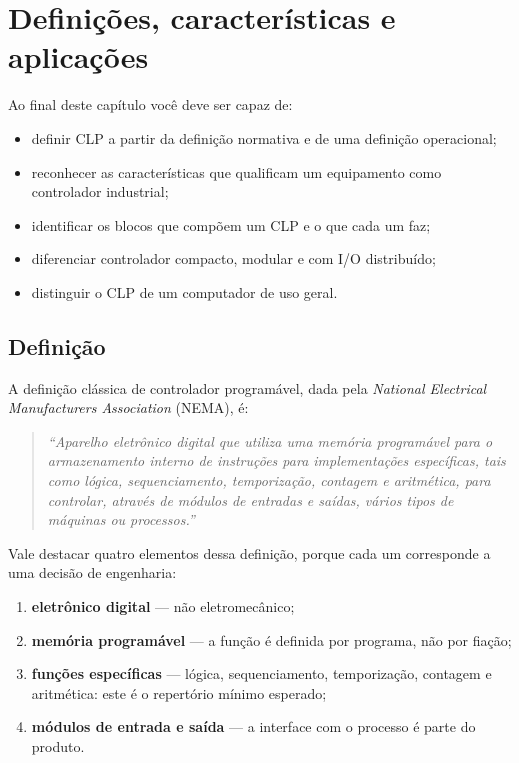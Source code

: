 \chapter{Definições, características e aplicações}
\label{cap:definicoes}

\begin{objetivos}
Ao final deste capítulo você deve ser capaz de:
\begin{itemize}
  \item definir CLP a partir da definição normativa e de uma definição operacional;
  \item reconhecer as características que qualificam um equipamento como controlador industrial;
  \item identificar os blocos que compõem um CLP e o que cada um faz;
  \item diferenciar controlador compacto, modular e com I/O distribuído;
  \item distinguir o CLP de um computador de uso geral.
\end{itemize}
\end{objetivos}

\section{Definição}

A definição clássica de controlador programável, dada pela \emph{National Electrical Manufacturers
Association} (NEMA), é:

\begin{quote}
\emph{``Aparelho eletrônico digital que utiliza uma memória programável para o armazenamento interno
de instruções para implementações específicas, tais como lógica, sequenciamento, temporização,
contagem e aritmética, para controlar, através de módulos de entradas e saídas, vários tipos de
máquinas ou processos.''}
\end{quote}

Vale destacar quatro elementos dessa definição, porque cada um corresponde a uma decisão de
engenharia:

\begin{enumerate}
  \item \textbf{eletrônico digital} --- não eletromecânico;
  \item \textbf{memória programável} --- a função é definida por programa, não por fiação;
  \item \textbf{funções específicas} --- lógica, sequenciamento, temporização, contagem e
        aritmética: este é o repertório mínimo esperado;
  \item \textbf{módulos de entrada e saída} --- a interface com o processo é parte do produto.
\end{enumerate}

